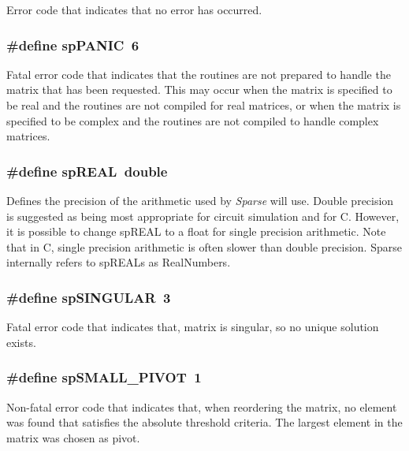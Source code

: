 Error code that indicates that no error has occurred. 
\subsubsection{\setlength{\rightskip}{0pt plus 5cm}\#define sp\-PANIC\ 6}\label{spMatrix_8h_a6}


Fatal error code that indicates that the routines are not prepared to handle the matrix that has been requested. This may occur when the matrix is specified to be real and the routines are not compiled for real matrices, or when the matrix is specified to be complex and the routines are not compiled to handle complex matrices. 
\subsubsection{\setlength{\rightskip}{0pt plus 5cm}\#define sp\-REAL\ double}\label{spMatrix_8h_a8}


Defines the precision of the arithmetic used by {\em Sparse} will use. Double precision is suggested as being most appropriate for circuit simulation and for C. However, it is possible to change sp\-REAL to a float for single precision arithmetic. Note that in C, single precision arithmetic is often slower than double precision. Sparse internally refers to sp\-REALs as Real\-Numbers. 
\subsubsection{\setlength{\rightskip}{0pt plus 5cm}\#define sp\-SINGULAR\ 3}\label{spMatrix_8h_a3}


Fatal error code that indicates that, matrix is singular, so no unique solution exists. 
\subsubsection{\setlength{\rightskip}{0pt plus 5cm}\#define sp\-SMALL\_\-PIVOT\ 1}\label{spMatrix_8h_a1}


Non-fatal error code that indicates that, when reordering the matrix, no element was found that satisfies the absolute threshold criteria. The largest element in the matrix was chosen as pivot. 
